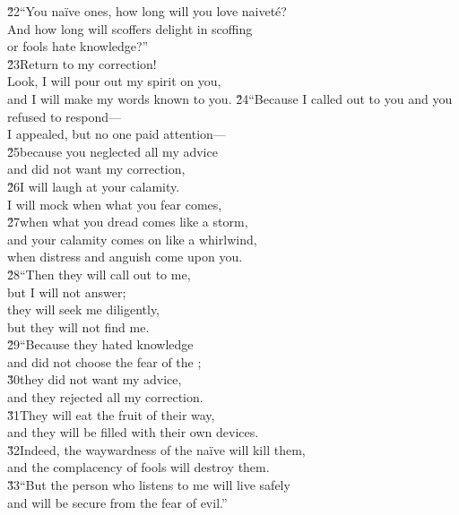 \begin{poetry}
\poeml \v{22}``You na\"{i}ve ones, how long will you love naivet\'{e}? \\
\poemll    And how long will scoffers delight in scoffing \\
\poemlll       or fools hate knowledge?'' \\
\poeml \v{23}Return to my correction! \\
\poemll    Look, I will pour out my spirit on you, \\
\poemlll       and I will make my words known to you.
\poeml \v{24}``Because I called out to you and you refused to respond--- \\
\poemll    I appealed, but no one paid attention--- \\
\poeml \v{25}because you neglected all my advice \\
\poemll    and did not want my correction, \\
\poeml \v{26}I will laugh at your calamity. \\
\poemll    I will mock when what you fear comes, \\
\poeml \v{27}when what you dread comes like a storm, \\
\poemll    and your calamity comes on like a whirlwind, \\
\poemlll       when distress and anguish come upon you. \\
\poeml \v{28}``Then they will call out to me, \\
\poemll    but I will not answer; \\
\poeml they will seek me diligently, \\
\poemll    but they will not find me. \\
\poeml \v{29}``Because they hated knowledge \\
\poemll    and did not choose the fear of the ; \\
\poeml \v{30}they did not want my advice, \\
\poemll    and they rejected all my correction. \\
\poeml \v{31}They will eat the fruit of their way, \\
\poemll    and they will be filled with their own devices. \\
\poeml \v{32}Indeed, the waywardness of the na\"{i}ve will kill them, \\
\poemll    and the complacency of fools will destroy them. \\
\poeml \v{33}``But the person who listens to me will live safely \\
\poemll    and will be secure from the fear of evil.''
\end{poetry}

